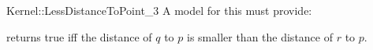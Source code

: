 \begin{ccRefFunctionObjectConcept}{Kernel::LessDistanceToPoint_3}
A model for this must provide:


{returns true iff the distance of $q$ to $p$ is
smaller than the distance of $r$ to $p$.}

\ccSeeAlso
{}

\end{ccRefFunctionObjectConcept}
